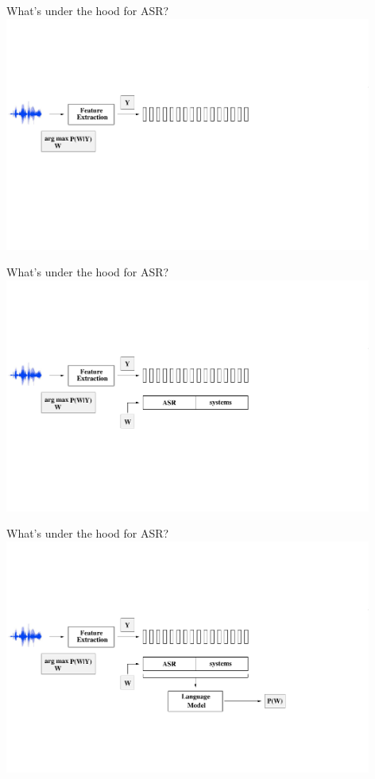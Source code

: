 \begin{frame}{What's under the hood for ASR?}
\includegraphics[height=77mm]{figures/ASR3}
\end{frame}

\begin{frame}{What's under the hood for ASR?}
\includegraphics[height=77mm]{figures/ASR4}
\end{frame}

\begin{frame}{What's under the hood for ASR?}
\includegraphics[height=77mm]{figures/ASR5}
\end{frame}

